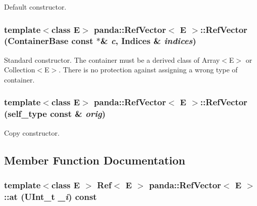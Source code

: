 Default constructor. \hypertarget{classpanda_1_1RefVector_ae57df86fdbdbf19bb5e9cf6dc03de029}{
\subsubsection[{RefVector}]{\setlength{\rightskip}{0pt plus 5cm}template$<$class E$>$ {\bf panda::RefVector}$<$ E $>$::{\bf RefVector} ({\bf ContainerBase} const $\ast$\& {\em c}, \/  {\bf Indices} \& {\em indices})}}
\label{classpanda_1_1RefVector_ae57df86fdbdbf19bb5e9cf6dc03de029}


Standard constructor. The container must be a derived class of Array$<$E$>$ or Collection$<$E$>$. There is no protection against assigning a wrong type of container. \hypertarget{classpanda_1_1RefVector_ad55015318ec150fd6e37dfa6941cb0b7}{
\subsubsection[{RefVector}]{\setlength{\rightskip}{0pt plus 5cm}template$<$class E$>$ {\bf panda::RefVector}$<$ E $>$::{\bf RefVector} ({\bf self\_\-type} const \& {\em orig})}}
\label{classpanda_1_1RefVector_ad55015318ec150fd6e37dfa6941cb0b7}


Copy constructor. 

\subsection{Member Function Documentation}
\hypertarget{classpanda_1_1RefVector_a38b88c25cf18683ec933d6936d4b3abc}{
\subsubsection[{at}]{\setlength{\rightskip}{0pt plus 5cm}template$<$class E $>$ {\bf Ref}$<$ E $>$ {\bf panda::RefVector}$<$ E $>$::at (UInt\_\-t {\em \_\-i}) const}}
\label{classpanda_1_1RefVector_a38b88c25cf18683ec933d6936d4b3abc}



